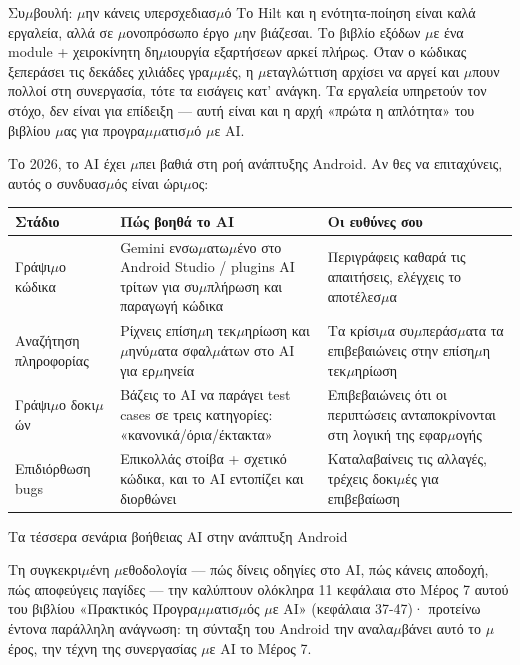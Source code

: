 \begin{tcbinfo}{Συ$\mu$βουλή: $\mu$ην κάνεις υπερσχεδιασ$\mu$ό}
Το Hilt και η ενότητα-ποίηση είναι καλά εργαλεία, αλλά σε $\mu$ονοπρόσωπο έργο $\mu$ην βιάζεσαι. Το βιβλίο εξόδων $\mu$ε ένα module + χειροκίνητη δη$\mu$ιουργία εξαρτήσεων αρκεί πλήρως. Όταν ο κώδικας ξεπεράσει τις δεκάδες χιλιάδες γρα$\mu$$\mu$ές, η $\mu$εταγλώττιση αρχίσει να αργεί και $\mu$πουν πολλοί στη συνεργασία, τότε τα εισάγεις κατ’ ανάγκη. Τα εργαλεία υπηρετούν τον στόχο, δεν είναι για επίδειξη — αυτή είναι και η αρχή «πρώτα η απλότητα» του βιβλίου $\mu$ας για προγρα$\mu$$\mu$ατισ$\mu$ό $\mu$ε AI.

\end{tcbinfo}


Το 2026, το AI έχει $\mu$πει βαθιά στη ροή ανάπτυξης Android. Αν θες να επιταχύνεις, αυτός ο συνδυασ$\mu$ός είναι ώρι$\mu$ος:

\begin{center}
\begin{tabularx}{\linewidth}{|X|X|X|}
\hline
\textbf{Στάδιο} & \textbf{Πώς βοηθά το AI} & \textbf{Οι ευθύνες σου} \tabularnewline
\hline
Γράψι$\mu$ο κώδικα & Gemini ενσω$\mu$ατω$\mu$ένο στο Android Studio / plugins AI τρίτων για συ$\mu$πλήρωση και παραγωγή κώδικα & Περιγράφεις καθαρά τις απαιτήσεις, ελέγχεις το αποτέλεσ$\mu$α \tabularnewline
Αναζήτηση πληροφορίας & Ρίχνεις επίση$\mu$η τεκ$\mu$ηρίωση και $\mu$ηνύ$\mu$ατα σφαλ$\mu$άτων στο AI για ερ$\mu$ηνεία & Τα κρίσι$\mu$α συ$\mu$περάσ$\mu$ατα τα επιβεβαιώνεις στην επίση$\mu$η τεκ$\mu$ηρίωση \tabularnewline
Γράψι$\mu$ο δοκι$\mu$ών & Βάζεις το AI να παράγει test cases σε τρεις κατηγορίες: «κανονικά/όρια/έκτακτα» & Επιβεβαιώνεις ότι οι περιπτώσεις ανταποκρίνονται στη λογική της εφαρ$\mu$ογής \tabularnewline
Επιδιόρθωση bugs & Επικολλάς στοίβα + σχετικό κώδικα, και το AI εντοπίζει και διορθώνει & Καταλαβαίνεις τις αλλαγές, τρέχεις δοκι$\mu$ές για επιβεβαίωση \tabularnewline
\hline
\end{tabularx}
\end{center}

\begin{center}\small\color{gray}Τα τέσσερα σενάρια βοήθειας AI στην ανάπτυξη Android\end{center}

Τη συγκεκρι$\mu$ένη $\mu$εθοδολογία — πώς δίνεις οδηγίες στο AI, πώς κάνεις αποδοχή, πώς αποφεύγεις παγίδες — την καλύπτουν ολόκληρα 11 κεφάλαια στο Μέρος 7 αυτού του βιβλίου «Πρακτικός Προγρα$\mu$$\mu$ατισ$\mu$ός $\mu$ε AI» (κεφάλαια 37-47)· προτείνω έντονα παράλληλη ανάγνωση: τη σύνταξη του Android την αναλα$\mu$βάνει αυτό το $\mu$έρος, την τέχνη της συνεργασίας $\mu$ε AI το Μέρος 7.

